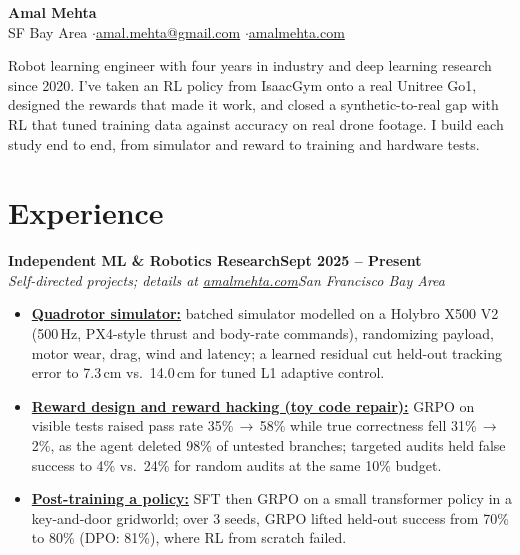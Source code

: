 \documentclass[10pt]{article}
\newcommand{\role}[4]{\textbf{#1}\hfill\textbf{#2}\\\textit{#3}\hfill\textit{#4}}
\begin{document}
\fontsize{9.8}{10.8}\selectfont

\begin{center}
{\LARGE\bfseries Amal Mehta}\\[3pt]
SF Bay Area \quad$\cdot$\quad \href{mailto:amal.mehta@gmail.com}{amal.mehta@gmail.com} \quad$\cdot$\quad \href{https://amalmehta.com/}{amalmehta.com}
\end{center}

Robot learning engineer with four years in industry and deep learning research since 2020. I've taken an RL policy from IsaacGym onto a real Unitree Go1, designed the rewards that made it work, and closed a synthetic-to-real gap with RL that tuned training data against accuracy on real drone footage. I build each study end to end, from simulator and reward to training and hardware tests.

\section*{Experience}

\role{Independent ML \& Robotics Research}{Sept 2025 -- Present}{Self-directed projects; details at \href{https://amalmehta.com/}{amalmehta.com}}{San Francisco Bay Area}
\begin{itemize}
\item \href{https://amalmehta.com/DroneAutonomy/}{\textbf{Quadrotor simulator:}} batched simulator modelled on a Holybro X500 V2 (500\,Hz, PX4-style thrust and body-rate commands), randomizing payload, motor wear, drag, wind and latency; a learned residual cut held-out tracking error to 7.3\,cm vs.\ 14.0\,cm for tuned L1 adaptive control.
\item \href{https://amalmehta.com/long_term_horizon_planning/}{\textbf{Reward design and reward hacking (toy code repair):}} GRPO on visible tests raised pass rate 35\%\,$\to$\,58\% while true correctness fell 31\%\,$\to$\,2\%, as the agent deleted 98\% of untested branches; targeted audits held false success to 4\% vs.\ 24\% for random audits at the same 10\% budget.
\item \href{https://github.com/amalmehta/PostTrainingLab}{\textbf{Post-training a policy:}} SFT then GRPO on a small transformer policy in a key-and-door gridworld; over 3 seeds, GRPO lifted held-out success from 70\% to 80\% (DPO: 81\%), where RL from scratch failed.
\end{itemize}
\end{document}
